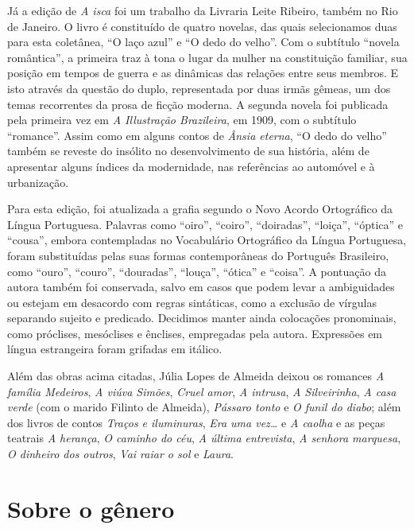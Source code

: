 Já a edição de \emph{A isca} foi um trabalho da Livraria Leite Ribeiro,
também no Rio de Janeiro. O livro é constituído de quatro novelas, das
quais selecionamos duas para esta coletânea, ``O laço azul'' e ``O dedo
do velho''. Com o subtítulo ``novela romântica'', a primeira traz à tona
o lugar da mulher na constituição familiar, sua posição em tempos de
guerra e as dinâmicas das relações entre seus membros. E isto através da
questão do duplo, representada por duas irmãs gêmeas, um dos temas
recorrentes da prosa de ficção moderna. A segunda novela foi publicada
pela primeira vez em \emph{A Illustração Brazileira}, em 1909, com o
subtítulo ``romance''. Assim como em alguns contos de \emph{Ânsia
eterna}, ``O dedo do velho'' também se reveste do insólito no
desenvolvimento de sua história, além de apresentar alguns índices da
modernidade, nas referências ao automóvel e à urbanização.

Para esta edição, foi atualizada a grafia segundo o Novo Acordo
Ortográfico da Língua Portuguesa. Palavras como ``oiro'', ``coiro'',
``doiradas'', ``loiça'', ``óptica'' e ``cousa'', embora contempladas no
Vocabulário Ortográfico da Língua Portuguesa, foram substituídas pelas
suas formas contemporâneas do Português Brasileiro, como ``ouro'',
``couro'', ``douradas'', ``louça'', ``ótica'' e ``coisa''. A pontuação
da autora também foi conservada, salvo em casos que podem levar a
ambiguidades ou estejam em desacordo com regras sintáticas, como a
exclusão de vírgulas separando sujeito e predicado. Decidimos manter
ainda colocações pronominais, como próclises, mesóclises e ênclises,
empregadas pela autora. Expressões em língua estrangeira foram grifadas
em itálico.

Além das obras acima citadas, Júlia Lopes de Almeida deixou os romances \textit{A família Medeiros}, \textit{A viúva Simões}, \textit{Cruel amor}, \textit{A intrusa},
\textit{A Silveirinha}, \textit{A casa verde} (com o marido Filinto de Almeida), \textit{Pássaro tonto} e \textit{O funil do diabo}; além dos livros de contos \textit{Traços e iluminuras}, \textit{Era uma vez\ldots} e \textit{A caolha} e as peças teatrais \textit{A herança}, \textit{O caminho do céu}, \textit{A última entrevista}, \textit{A senhora marquesa}, \textit{O dinheiro dos outros}, \textit{Vai raiar o sol} e \textit{Laura}.

\section{Sobre o gênero}


